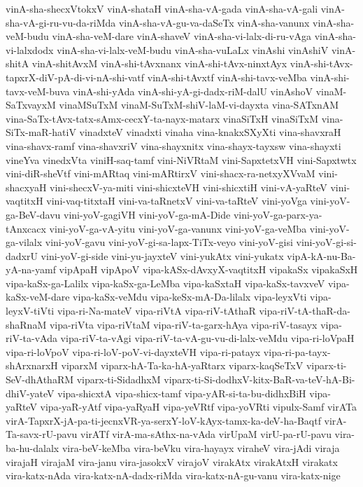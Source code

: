 {vinA-sha-shecxVtokxV
vinA-shataH
vinA-sha-vA-gada
vinA-sha-vA-gali
vinA-sha-vA-gi-ru-vu-da-riMda
vinA-sha-vA-gu-va-daSeTx
vinA-sha-vanunx
vinA-sha-veM-budu
vinA-sha-veM-dare
vinA-shaveV
vinA-sha-vi-lalx-di-ru-vAga
vinA-sha-vi-lalxdodx
vinA-sha-vi-lalx-veM-budu
vinA-sha-vuLaLx
vinAshi
vinAshiV
vinA-shitA
vinA-shitAvxM
vinA-shi-tAvxnanx
vinA-shi-tAvx-ninxtAyx
vinA-shi-tAvx-tapxrX-diV-pA-di-vi-nA-shi-vatf
vinA-shi-tAvxtf
vinA-shi-tavx-veMba
vinA-shi-tavx-veM-buva
vinA-shi-yAda
vinA-shi-yA-gi-dadx-riM-dalU
vinAshoV
vinaM-SaTxvayxM
vinaMSuTxM
vinaM-SuTxM-shiV-laM-vi-dayxta
vina-SATxnAM
vina-SaTx-tAvx-tatx-sAmx-cecxY-ta-nayx-matarx
vinaSiTxH
vinaSiTxM
vina-SiTx-maR-hatiV
vinadxteV
vinadxti
vinaha
vina-knakxSXyXti
vina-shavxraH
vina-shavx-ramf
vina-shavxriV
vina-shayxnitx
vina-shayx-tayxsw
vina-shayxti
vineYva
vinedxVta
viniH-saq-tamf
vini-NiVRtaM
vini-SapxtetxVH
vini-Sapxtwtx
vini-diR-sheVtf
vini-mARtaq
vini-mARtirxV
vini-shacx-ra-netxyXVvaM
vini-shacxyaH
vini-shecxV-ya-miti
vini-shicxteVH
vini-shicxtiH
vini-vA-yaRteV
vini-vaqtitxH
vini-vaq-titxtaH
vini-va-taRnetxV
vini-va-taRteV
vini-yoVga
vini-yoV-ga-BeV-davu
vini-yoV-gagiVH
vini-yoV-ga-mA-Dide
vini-yoV-ga-parx-ya-tAnxcacx
vini-yoV-ga-vA-yitu
vini-yoV-ga-vanunx
vini-yoV-ga-veMba
vini-yoV-ga-vilalx
vini-yoV-gavu
vini-yoV-gi-sa-lapx-TiTx-veyo
vini-yoV-gisi
vini-yoV-gi-si-dadxrU
vini-yoV-gi-side
vini-yu-jayxteV
vini-yukAtx
vini-yukatx
vipA-kA-nu-Ba-yA-na-yamf
vipApaH
vipApoV
vipa-kASx-dAvxyX-vaqtitxH
vipakaSx
vipakaSxH
vipa-kaSx-ga-Lalilx
vipa-kaSx-ga-LeMba
vipa-kaSxtaH
vipa-kaSx-tavxveV
vipa-kaSx-veM-dare
vipa-kaSx-veMdu
vipa-keSx-mA-Da-lilalx
vipa-leyxVti
vipa-leyxV-tiVti
vipa-ri-Na-mateV
vipa-riVtA
vipa-riV-tAthaR
vipa-riV-tA-thaR-da-shaRnaM
vipa-riVta
vipa-riVtaM
vipa-riV-ta-garx-hAya
vipa-riV-tasayx
vipa-riV-ta-vAda
vipa-riV-ta-vAgi
vipa-riV-ta-vA-gu-vu-di-lalx-veMdu
vipa-ri-loVpaH
vipa-ri-loVpoV
vipa-ri-loV-poV-vi-dayxteVH
vipa-ri-patayx
vipa-ri-pa-tayx-shArxnarxH
viparxM
viparx-hA-Ta-ka-hA-yaRtarx
viparx-kaqSeTxV
viparx-ti-SeV-dhAthaRM
viparx-ti-SidadhxM
viparx-ti-Si-dodhxV-kitx-BaR-va-teV-hA-Bi-dhiV-yateV
vipa-shicxtA
vipa-shicx-tamf
vipa-yAR-si-ta-bu-didhxBiH
vipa-yaRteV
vipa-yaR-yAtf
vipa-yaRyaH
vipa-yeVRtf
vipa-yoVRti
vipulx-Samf
virATa
virA-TapxrX-jA-pa-ti-jecnxVR-ya-serxY-loV-kAyx-tamx-ka-deV-ha-Baqtf
virA-Ta-savx-rU-pavu
virATf
virA-ma-sAthx-na-vAda
virUpaM
virU-pa-rU-pavu
vira-ba-hu-dalalx
vira-beV-keMba
vira-beVku
vira-hayayx
viraheV
vira-jAdi
viraja
virajaH
virajaM
vira-janu
vira-jasokxV
virajoV
virakAtx
virakAtxH
virakatx
vira-katx-nAda
vira-katx-nA-dadx-riMda
vira-katx-nA-gu-vanu
vira-katx-nige
}
